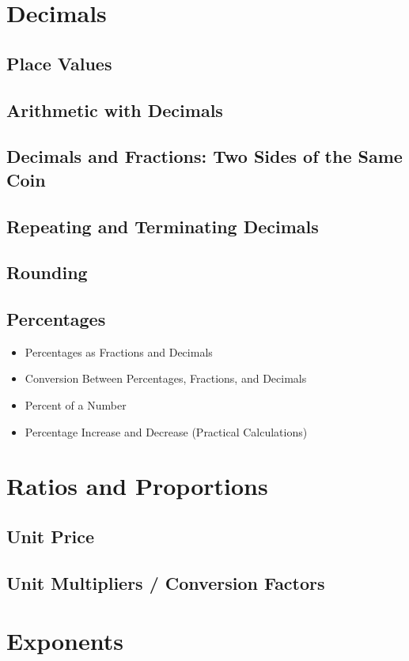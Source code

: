\documentclass[11pt]{article}
\begin{document}
\section{Decimals}
\subsection{Place Values}
\subsection{Arithmetic with Decimals}
\subsection{Decimals and Fractions: Two Sides of the Same Coin}
\subsection{Repeating and Terminating Decimals}
\subsection{Rounding}
\subsection{Percentages}
\begin{itemize}
    \item Percentages as Fractions and Decimals
    \item Conversion Between Percentages, Fractions, and Decimals
    \item Percent of a Number
    \item Percentage Increase and Decrease (Practical Calculations)
\end{itemize}

\section{Ratios and Proportions}
\subsection{Unit Price}
\subsection{Unit Multipliers / Conversion Factors}

\section{Exponents}
\end{document}
